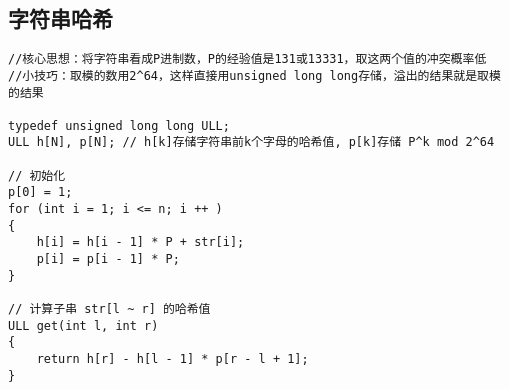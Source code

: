 \documentclass[12pt,a4paper,UTF16]{ctexbook}
\theoremstyle{plain}
\begin{document}
\subsection{字符串哈希}
\begin{lstlisting}
//核心思想：将字符串看成P进制数，P的经验值是131或13331，取这两个值的冲突概率低
//小技巧：取模的数用2^64，这样直接用unsigned long long存储，溢出的结果就是取模的结果

typedef unsigned long long ULL;
ULL h[N], p[N]; // h[k]存储字符串前k个字母的哈希值, p[k]存储 P^k mod 2^64

// 初始化
p[0] = 1;
for (int i = 1; i <= n; i ++ )
{
    h[i] = h[i - 1] * P + str[i];
    p[i] = p[i - 1] * P;
}

// 计算子串 str[l ~ r] 的哈希值
ULL get(int l, int r)
{
    return h[r] - h[l - 1] * p[r - l + 1];
}

\end{lstlisting}
\end{document}
